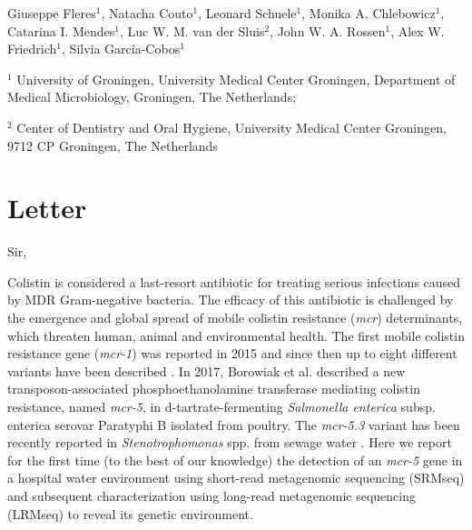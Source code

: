 Giuseppe Fleres$^1$, 
Natacha Couto$^1$, 
Leonard Schuele$^1$,
Monika A. Chlebowicz$^1$,
Catarina I. Mendes$^1$,
Luc W. M. van der Sluis$^2$, 
John W. A. Rossen$^1$, 
Alex W. Friedrich$^1$, 
Silvia García-Cobos$^1$

$^1$ University of Groningen, University Medical Center Groningen, Department of Medical Microbiology, Groningen, The Netherlands;

$^2$ Center of Dentistry and Oral Hygiene, University
Medical Center Groningen, 9712 CP Groningen, The Netherlands

\section{Letter}

Sir,

Colistin is considered a last-resort antibiotic for treating serious infections caused by MDR Gram-negative bacteria. 
The efficacy of this antibiotic is challenged by the emergence and global spread of mobile colistin resistance (\textit{mcr}) determinants, which threaten human, animal and environmental health. 
The first mobile colistin resistance gene (\textit{mcr-1}) was reported in 2015 and since then up to eight different variants have been described \citep{wang_emergence_2018}. 
In 2017, Borowiak et al.\citep{borowiak_identification_2017} described a new transposon-associated phosphoethanolamine transferase mediating colistin resistance, named \textit{mcr-5}, in d-tartrate-fermenting \textit{Salmonella enterica} subsp. enterica serovar Paratyphi B isolated from poultry. 
The \textit{mcr-5.3} variant has been recently reported in \textit{Stenotrophomonas} spp. from sewage water \citep{li_co-occurrence_2019}.
Here we report for the first time (to the best of our knowledge) the detection of an \textit{mcr-5} gene in a hospital water environment using short-read metagenomic sequencing (SRMseq) and subsequent characterization using long-read metagenomic sequencing (LRMseq) to reveal its genetic environment.

